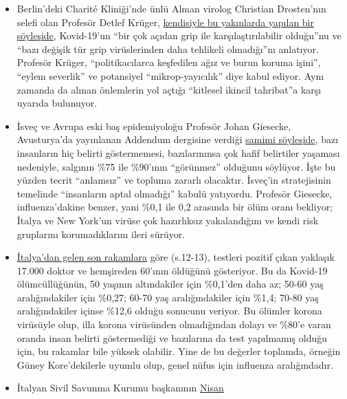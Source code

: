 \begin{itemize}
\tightlist
\item
  Berlin'deki Charité Kliniği'nde ünlü Alman virolog Christian
  Drosten'nın selefi olan Profesör Detlef Krüger,
  \href{https://de.sputniknews.com/interviews/20200425326953541-corona-gefahr-virologe/}{kendisiyle
  bu yakınlarda yapılan bir söyleşide}, Kovid-19'un ``bir çok açıdan
  grip ile karşılaştırılabilir olduğu''nu ve ``bazı değişik tür grip
  virüslerinden daha tehlikeli olmadığı''nı anlatıyor. Profesör Krüger,
  ``politikacılarca keşfedilen ağız ve burun koruma işini'', ``eylem
  severlik'' ve potansiyel ``mikrop-yayıcılık'' diye kabul ediyor. Aynı
  zamanda da alınan önlemlerin yol açtığı ``kitlesel ikincil tahribat''a
  karşı uyarıda bulunuyor.
\item
  İsveç ve Avrupa eski baş epidemiyoloğu Profesör Johan Giesecke,
  Avusturya'da yayınlanan Addendum dergisine verdiği
  \href{https://www.addendum.org/coronavirus/interview-johan-giesecke/}{samimi
  söyleşide}, bazı insanların hiç belirti göstermemesi, bazılarınınsa
  çok hafif belirtiler yaşaması nedeniyle, salgının \%75 ile \%90'ının
  ``görünmez'' olduğunu söylüyor. İşte bu yüzden tecrit ``anlamsız'' ve
  topluma zararlı olacaktır. İsveç'in stratejisinin temelinde
  ``insanların aptal olmadığı'' kabulü yatıyordu. Profesör Giesecke,
  influenza'dakine benzer, yani \%0,1 ile 0,2 arasında bir ölüm oranı
  bekliyor; İtalya ve New York'un virüse çok hazırlıksız yakalandığını
  ve kendi risk gruplarını korumadıklarını ileri sürüyor.
\item
  \href{https://www.epicentro.iss.it/coronavirus/bollettino/Bollettino-sorveglianza-integrata-COVID-19_16-aprile-2020.pdf\#page=13}{İtalya'dan
  gelen son rakamlara} göre (s.12-13), testleri pozitif çıkan yaklaşık
  17.000 doktor ve hemşireden 60'ının öldüğünü gösteriyor. Bu da
  Kovid-19 ölümcüllüğünün, 50 yaşının altındakiler için \%0,1'den daha
  az; 50-60 yaş aralığındakiler için \%0,27; 60-70 yaş aralığındakiler
  için \%1,4; 70-80 yaş aralığındakiler içinse \%12,6 olduğu sonucunu
  veriyor. Bu ölümler korona virüsüyle olup, illa korona virüsünden
  olmadığından dolayı ve \%80'e varan oranda insan belirti göstermediği
  ve bazılarına da test yapılmamış olduğu için, bu rakamlar bile yüksek
  olabilir. Yine de bu değerler toplamda, örneğin Güney Kore'dekilerle
  uyumlu olup, genel nüfus için influenza aralığındadır.
\item
  İtalyan Sivil Savunma Kurumu başkanının
  \href{https://www.theguardian.com/world/2020/apr/16/italian-police-broaden-care-home-coronavirus-milan}{Nisan
}
\end{itemize}
